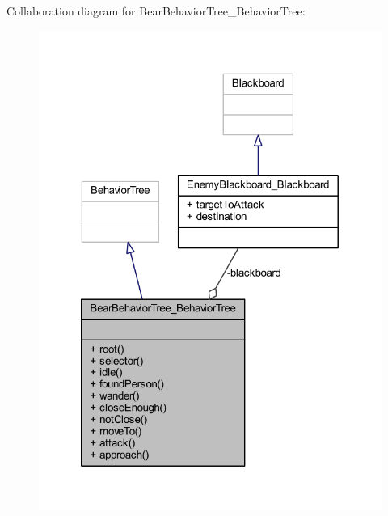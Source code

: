 Collaboration diagram for Bear\+Behavior\+Tree\+\_\+\+Behavior\+Tree\+:
\nopagebreak
\begin{figure}[H]
\begin{center}
\leavevmode
\includegraphics[width=321pt]{class_bear_behavior_tree___behavior_tree__coll__graph}
\end{center}
\end{figure}
